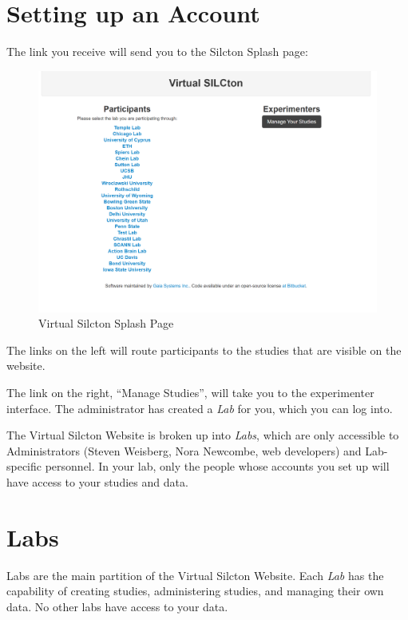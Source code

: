 \documentclass[
  12pt,
]{book}
\begin{document}
\hypertarget{setting-up-an-account}{%
\section{Setting up an Account}\label{setting-up-an-account}}

The link you receive will send you to the Silcton Splash page:

\begin{figure}
\centering
\includegraphics{./figs/exp_interface_1.png}
\caption{Virtual Silcton Splash Page}
\end{figure}

The links on the left will route participants to the studies that are visible on the website.

The link on the right, ``Manage Studies'', will take you to the experimenter interface. The administrator has created a \emph{Lab} for you, which you can log into.

The Virtual Silcton Website is broken up into \emph{Labs}, which are only accessible to Administrators (Steven Weisberg, Nora Newcombe, web developers) and Lab-specific personnel. In your lab, only the people whose accounts you set up will have access to your studies and data.

\hypertarget{labs}{%
\section{Labs}\label{labs}}

Labs are the main partition of the Virtual Silcton Website. Each \emph{Lab} has the capability of creating studies, administering studies, and managing their own data. No other labs have access to your data.
\end{document}
